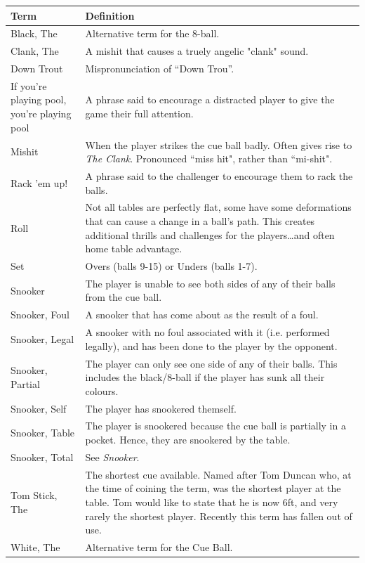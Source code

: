 \documentclass[a4paper, twocolumn]{article}
\begin{document}
\small
\begin{center}
    \begin{tabular}{  p{}  p{}  } 
      \hline
      \textbf{Term} & \textbf{Definition} \\ \hline
      Black, The & Alternative term for the 8-ball. \\ \hline
      Clank, The & A mishit that causes a truely angelic "clank" sound. \\ \hline
      Down Trout & Mispronunciation of “Down Trou”. \\ \hline
      If you're playing pool, you're playing pool & A phrase said to encourage a distracted player to give the game their full attention. \\ \hline
      Mishit & When the player strikes the cue ball badly. Often gives rise to \emph{The Clank}. Pronounced “miss hit", rather than “mi-shit".\\ \hline
      Rack 'em up! & A phrase said to the challenger to encourage them to rack the balls. \\ \hline
      Roll & Not all tables are perfectly flat, some have some deformations that can cause a change in a ball's path. This creates additional thrills and challenges for the players\dots and often home table advantage.\\ \hline
      Set & Overs (balls 9-15) or Unders (balls 1-7). \\ \hline
      Snooker & The player is unable to see both sides of any of their balls from the cue ball. \\ \hline
      Snooker, Foul & A snooker that has come about as the result of a foul. \\ \hline
      Snooker, Legal & A snooker with no foul associated with it (i.e. performed legally), and has been done to the player by the opponent. \\ \hline
      Snooker, Partial & The player can only see one side of any of their balls. This includes the black/8-ball if the player has sunk all their colours. \\ \hline
      Snooker, Self & The player has snookered themself. \\ \hline
      Snooker, Table & The player is snookered because the cue ball is partially in a pocket. Hence, they are snookered by the table.\\ \hline
      Snooker, Total & See \emph{Snooker}. \\ \hline
      Tom Stick, The & The shortest cue available. Named after Tom Duncan who, at the time of coining the term, was the shortest player at the table. Tom would like to state that he is now 6ft, and very rarely the shortest player. Recently this term has fallen out of use. \\ \hline
      White, The & Alternative term for the Cue Ball. \\ \hline
    \end{tabular}
\end{center}
\normalsize

\newpage
\end{document}
